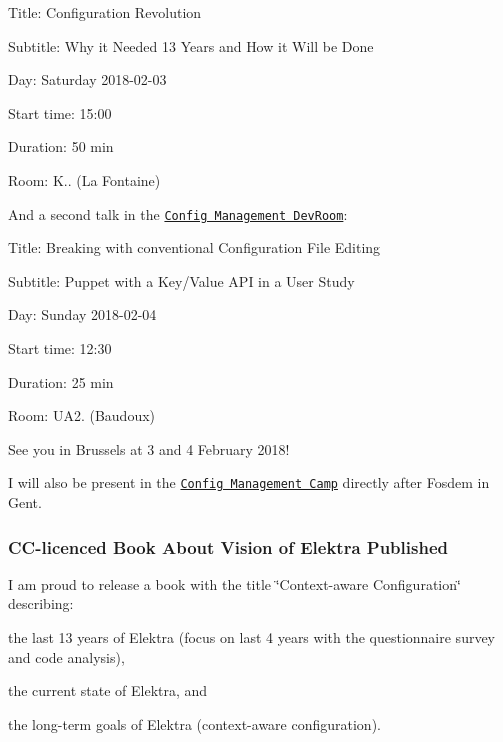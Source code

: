 \begin{DoxyItemize}
\item Title\+: Configuration Revolution
\item Subtitle\+: Why it Needed 13 Years and How it Will be Done
\item Day\+: Saturday 2018-\/02-\/03
\item Start time\+: 15\+:00
\item Duration\+: 50 min
\item Room\+: K.. (La Fontaine)
\end{DoxyItemize}

And a second talk in the \href{https://fosdem.org/2018/schedule/event/puppet_key_value/}{\tt Config Management Dev\+Room}\+:


\begin{DoxyItemize}
\item Title\+: Breaking with conventional Configuration File Editing
\item Subtitle\+: Puppet with a Key/\+Value A\+PI in a User Study
\item Day\+: Sunday 2018-\/02-\/04
\item Start time\+: 12\+:30
\item Duration\+: 25 min
\item Room\+: U\+A2. (Baudoux)
\end{DoxyItemize}

See you in Brussels at 3 and 4 February 2018!

I will also be present in the \href{http://cfgmgmtcamp.eu/}{\tt Config Management Camp} directly after Fosdem in Gent.

\subsubsection*{C\+C-\/licenced Book About Vision of Elektra Published}

I am proud to release a book with the title \char`\"{}\+Context-\/aware Configuration\char`\"{} describing\+:


\begin{DoxyItemize}
\item the last 13 years of Elektra (focus on last 4 years with the questionnaire survey and code analysis),
\item the current state of Elektra, and
\item the long-\/term goals of Elektra (context-\/aware configuration).
\end{DoxyItemize}

